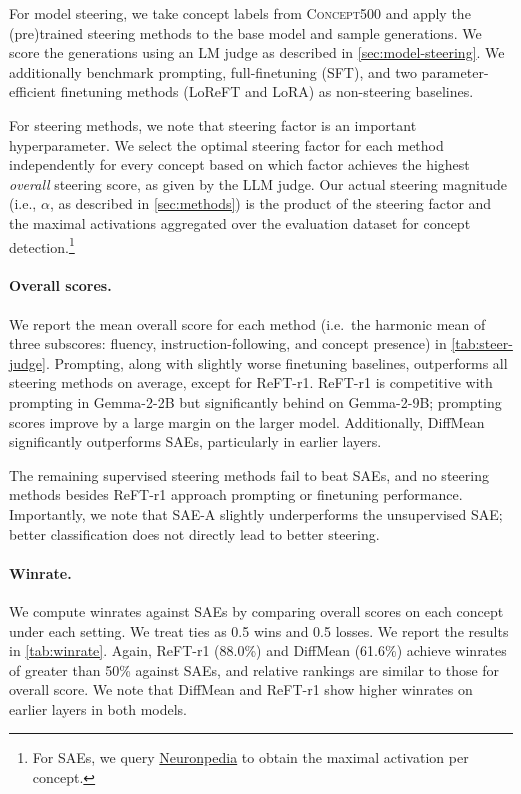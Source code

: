 \documentclass{article}
\theoremstyle{plain}
\theoremstyle{definition}
\theoremstyle{remark}
\begin{document}
For model steering, we take concept labels from \textsc{Concept500} and apply the (pre)trained steering methods to the base model and sample generations. We score the generations using an LM judge as described in \cref{sec:model-steering}. We additionally benchmark prompting, full-finetuning (SFT), and two parameter-efficient finetuning methods (LoReFT and LoRA) as non-steering baselines.

For steering methods, we note that steering factor is an important hyperparameter. We select the optimal steering factor for each method independently for every concept based on which factor achieves the highest \textit{overall} steering score, as given by the LLM judge. Our actual steering magnitude (i.e., $\alpha$, as described in \cref{sec:methods}) is the product of the steering factor and the maximal activations aggregated over the evaluation dataset for concept detection.\footnote{For SAEs, we query \href{https://www.neuronpedia.org/}{Neuronpedia} to obtain the maximal activation per concept.}

\paragraph{Overall scores.} We report the mean overall score for each method (i.e.~the harmonic mean of three subscores: fluency, instruction-following, and concept presence) in \cref{tab:steer-judge}. Prompting, along with slightly worse finetuning baselines, outperforms all steering methods on average, except for ReFT-r1. ReFT-r1 is competitive with prompting in Gemma-2-2B but significantly behind on Gemma-2-9B; prompting scores improve by a large margin on the larger model. Additionally, DiffMean significantly outperforms SAEs, particularly in earlier layers. 

The remaining supervised steering methods fail to beat SAEs, and no steering methods besides ReFT-r1 approach prompting or finetuning performance. Importantly, we note that SAE-A slightly underperforms the unsupervised SAE; better classification does not directly lead to better steering.

\paragraph{Winrate.} We compute winrates against SAEs by comparing overall scores on each concept under each setting. We treat ties as 0.5 wins and 0.5 losses. We report the results in \cref{tab:winrate}. Again, ReFT-r1 (88.0\%) and DiffMean (61.6\%) achieve winrates of greater than 50\% against SAEs, and relative rankings are similar to those for overall score. We note that DiffMean and ReFT-r1 show higher winrates on earlier layers in both models.
\end{document}
